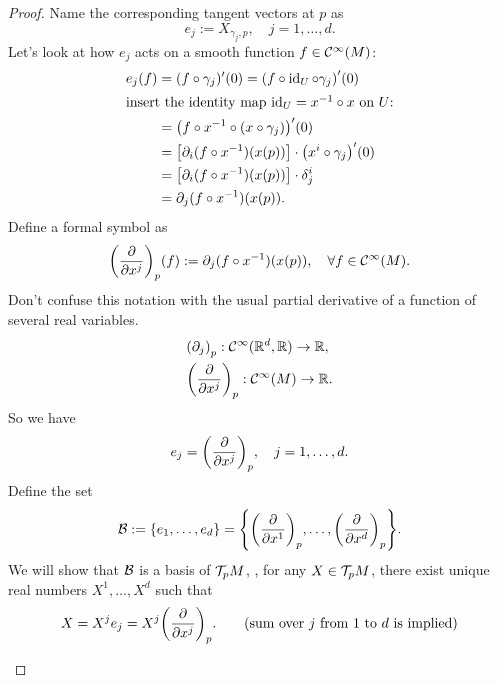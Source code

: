 \begin{proof}
    Name the corresponding tangent vectors at \(p\) as
    \begin{equation}
        e_j := X_{\gamma_j, p}, \quad j = 1, \ldots, d.
    \end{equation}
    Let's look at how \(e_j\) acts on a smooth function \(f \in \mathcal C^\infty(M)\):
    \begin{align*}
        e_j(f) & = (f \circ \gamma_j)'(0) = \qty(f \circ \operatorname{id}_U \circ \gamma_j)'(0)            \\
        \shortintertext{insert the identity map \(\operatorname{id}_U = x^{-1} \circ x\) on \(U\):}
               & = \qty(f \circ x^{-1} \circ (x \circ \gamma_j))'(0)                          \\
               & = \qty[\partial_i (f \circ x^{-1})(x(p))] \cdot \qty(x^i \circ \gamma_j)'(0) \\
               & = \qty[\partial_i (f \circ x^{-1})(x(p))] \cdot \delta_j^i                   \\
               & = \partial_j (f \circ x^{-1})(x(p)).
    \end{align*}
    Define a formal symbol as
    \begin{equation}
        \qty(\pdv{x^j})_p (f) := \partial_j (f \circ x^{-1})(x(p)), \quad \forall f \in \mathcal C^\infty(M).
    \end{equation}
    Don't confuse this notation with the usual partial derivative of a function of several real variables.
    \begin{align*}
         & \qty(\partial_j)_p: \mathcal C^\infty(\mathbb R^d, \mathbb R) \to \mathbb R, \\
         & \qty(\pdv{x^j})_p: \mathcal C^\infty(M) \to \mathbb R.
    \end{align*}
    So we have
    \begin{equation}
        e_j = \qty(\pdv{x^j})_p, \quad j = 1, \ldots, d.
    \end{equation}
    Define the set
    \begin{equation}
        \mathcal B := \qty{e_1, \ldots, e_d} = \qty{\qty(\pdv{x^1})_p, \ldots, \qty(\pdv{x^d})_p}.
    \end{equation}
    We will show that \(\mathcal B\) is a basis of \(\mathcal T_p M\), \ie, for any \(X \in \mathcal T_p M\), there exist unique real numbers \(X^1, \ldots, X^d\) such that
    \begin{equation}
        X = X^j e_j = X^j \qty(\pdv{x^j})_p. \qquad \text{(sum over \(j\) from \(1\) to \(d\) is implied)}
    \end{equation}
    \begin{enumerate}

\end{enumerate}
\end{proof}
